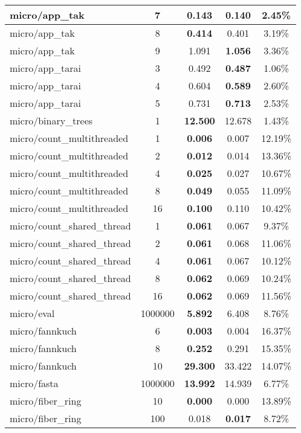 \begin{center}
\begin{longtable}{l|c|c|c|c}
  micro/app\_tak & 7 & 0.143 & \textbf{0.140} & 2.45\% \\ \hline
  micro/app\_tak & 8 & \textbf{0.414} & 0.401 & 3.19\% \\ \hline
  micro/app\_tak & 9 & 1.091 & \textbf{1.056} & 3.36\% \\ \hline
  micro/app\_tarai & 3 & 0.492 & \textbf{0.487} & 1.06\% \\ \hline
  micro/app\_tarai & 4 & 0.604 & \textbf{0.589} & 2.60\% \\ \hline
  micro/app\_tarai & 5 & 0.731 & \textbf{0.713} & 2.53\% \\ \hline
  micro/binary\_trees & 1 & \textbf{12.500} & 12.678 & 1.43\% \\ \hline
  micro/count\_multithreaded & 1 & \textbf{0.006} & 0.007 & 12.19\% \\ \hline
  micro/count\_multithreaded & 2 & \textbf{0.012} & 0.014 & 13.36\% \\ \hline
  micro/count\_multithreaded & 4 & \textbf{0.025} & 0.027 & 10.67\% \\ \hline
  micro/count\_multithreaded & 8 & \textbf{0.049} & 0.055 & 11.09\% \\ \hline
  micro/count\_multithreaded & 16 & \textbf{0.100} & 0.110 & 10.42\% \\ \hline
  micro/count\_shared\_thread & 1 & \textbf{0.061} & 0.067 & 9.37\% \\ \hline
  micro/count\_shared\_thread & 2 & \textbf{0.061} & 0.068 & 11.06\% \\ \hline
  micro/count\_shared\_thread & 4 & \textbf{0.061} & 0.067 & 10.12\% \\ \hline
  micro/count\_shared\_thread & 8 & \textbf{0.062} & 0.069 & 10.24\% \\ \hline
  micro/count\_shared\_thread & 16 & \textbf{0.062} & 0.069 & 11.56\% \\ \hline
  micro/eval & 1000000 & \textbf{5.892} & 6.408 & 8.76\% \\ \hline
  micro/fannkuch & 6 & \textbf{0.003} & 0.004 & 16.37\% \\ \hline
  micro/fannkuch & 8 & \textbf{0.252} & 0.291 & 15.35\% \\ \hline
  micro/fannkuch & 10 & \textbf{29.300} & 33.422 & 14.07\% \\ \hline
  micro/fasta & 1000000 & \textbf{13.992} & 14.939 & 6.77\% \\ \hline
  micro/fiber\_ring & 10 & \textbf{0.000} & 0.000 & 13.89\% \\ \hline
  micro/fiber\_ring & 100 & 0.018 & \textbf{0.017} & 8.72\% \\ \hline

\end{longtable}
\end{center}
